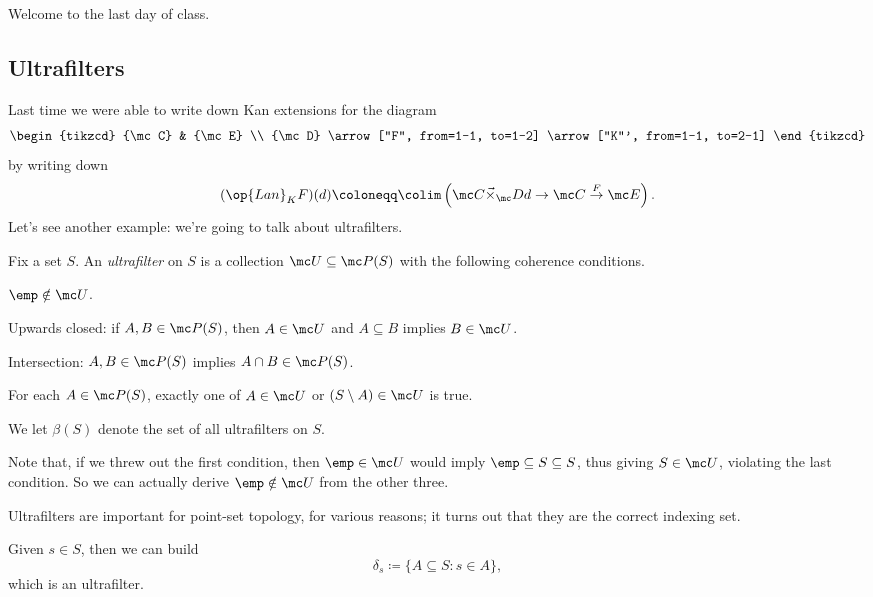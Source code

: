 \documentclass[../notes.tex]{subfiles}
\begin{document}

Welcome to the last day of class.

\subsection{Ultrafilters}
Last time we were able to write down Kan extensions for the diagram
\[\begin{tikzcd}
	{\mc C} & {\mc E} \\
	{\mc D}
	\arrow["F", from=1-1, to=1-2]
	\arrow["K"', from=1-1, to=2-1]
\end{tikzcd}\]
by writing down
\[(\op{Lan}_KF)(d)\coloneqq\colim\left(\mc C\vec\times_\mc Dd\to\mc C\stackrel F\to\mc E\right).\]
Let's see another example: we're going to talk about ultrafilters.
\begin{definition}[Ultrafilter]
	Fix a set $S$. An \textit{ultrafilter} on $S$ is a collection $\mc U\subseteq\mc P(S)$ with the following coherence conditions.
	\begin{listalph}
		\item $\emp\notin\mc U$.
		\item Upwards closed: if $A,B\in\mc P(S)$, then $A\in\mc U$ and $A\subseteq B$ implies $B\in\mc U$.
		\item Intersection: $A,B\in\mc P(S)$ implies $A\cap B\in\mc P(S)$.
		\item For each $A\in\mc P(S)$, exactly one of $A\in\mc U$ or $(S\setminus A)\in\mc U$ is true.
	\end{listalph}
	We let $\beta(S)$ denote the set of all ultrafilters on $S$.
\end{definition}
\begin{remark}
	Note that, if we threw out the first condition, then $\emp\in\mc U$ would imply $\emp\subseteq S\subseteq S$, thus giving $S\in\mc U$, violating the last condition. So we can actually derive $\emp\notin\mc U$ from the other three.
\end{remark}
Ultrafilters are important for point-set topology, for various reasons; it turns out that they are the correct indexing set.
\begin{example}
	Given $s\in S$, then we can build
	\[\delta_s\coloneqq\{A\subseteq S:s\in A\},\]
	which is an ultrafilter.
\end{example}
\end{document}

